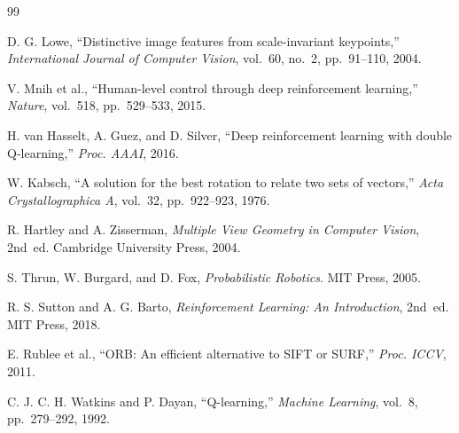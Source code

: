 \documentclass[12pt,a4paper,twoside]{report}
\theoremstyle{definition}
\begin{document}
\begin{thebibliography}{99}

D. G. Lowe,
``Distinctive image features from scale-invariant keypoints,''
\textit{International Journal of Computer Vision}, vol.~60, no.~2, pp.~91--110, 2004.

V. Mnih et al.,
``Human-level control through deep reinforcement learning,''
\textit{Nature}, vol.~518, pp.~529--533, 2015.

H. van Hasselt, A. Guez, and D. Silver,
``Deep reinforcement learning with double Q-learning,''
\textit{Proc. AAAI}, 2016.

W. Kabsch,
``A solution for the best rotation to relate two sets of vectors,''
\textit{Acta Crystallographica A}, vol.~32, pp.~922--923, 1976.

R. Hartley and A. Zisserman,
\textit{Multiple View Geometry in Computer Vision}, 2nd~ed.
Cambridge University Press, 2004.

S. Thrun, W. Burgard, and D. Fox,
\textit{Probabilistic Robotics}.
MIT Press, 2005.

R. S. Sutton and A. G. Barto,
\textit{Reinforcement Learning: An Introduction}, 2nd~ed.
MIT Press, 2018.

E. Rublee et al.,
``ORB: An efficient alternative to SIFT or SURF,''
\textit{Proc. ICCV}, 2011.

C. J. C. H. Watkins and P. Dayan,
``Q-learning,''
\textit{Machine Learning}, vol.~8, pp.~279--292, 1992.

\end{thebibliography}
\end{document}
